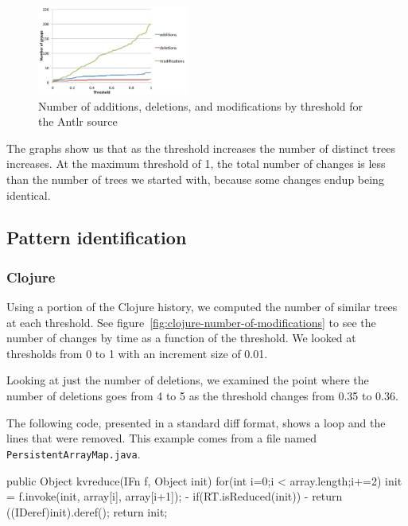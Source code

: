 \begin{figure}
\begin{center}
\includegraphics[width=0.44\textwidth]{figures/antlr-number-of-modifications.pdf}
\caption{Number of additions, deletions, and modifications by threshold for the Antlr source}
\label{fig:antlr-number-of-modifications}
\end{center}
\end{figure}

The graphs show us that as the threshold increases the number of distinct trees
increases. At the maximum threshold of 1, the total number of changes is less
than the number of trees we started with, because some changes endup being
identical.

\subsection{Pattern identification}

\subsubsection{Clojure}
Using a portion of the Clojure history, we computed the number of similar trees
at each threshold. See figure~\ref{fig:clojure-number-of-modifications} to see
the number of changes by time as a function of the threshold. We looked at
thresholds from 0 to 1 with an increment size of 0.01.

Looking at just the number of deletions, we examined the point where the number
of deletions goes from 4 to 5 as the threshold changes from 0.35 to 0.36.

The following code, presented in a standard diff format, shows a loop and the
lines that were removed. This example comes from a file named {\tt
PersistentArrayMap.java}.

\begin{java}
 public Object kvreduce(IFn f, Object init){
     for(int i=0;i < array.length;i+=2){
         init = f.invoke(init, array[i], array[i+1]);
-           if(RT.isReduced(init))
-                   return ((IDeref)init).deref();
         }
     return init;
 }
\end{java}

